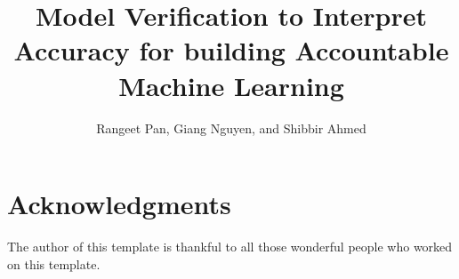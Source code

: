 \documentclass{llncs}
\begin{document}
\title{Model Verification to Interpret Accuracy for building Accountable Machine Learning}

\author{Rangeet Pan, Giang Nguyen, and Shibbir Ahmed}

%



\maketitle

\begin{abstract}

\end{abstract}

 



 
%
%
%
\section{Acknowledgments}

The author of this template is thankful to all those 
wonderful people who worked on this template. 


  
\end{document}

